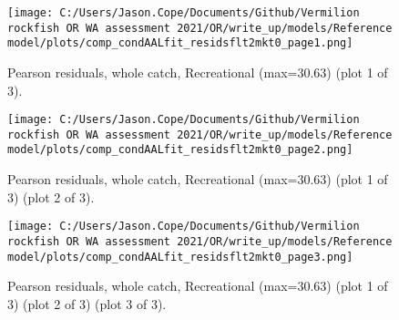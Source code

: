 \documentclass[11pt,
  english,
  a4paper,
]{article}
\begin{document}
\tagmcend\tagstructend


\begin{figure}
\centering
\texttt{[image: C:/Users/Jason.Cope/Documents/Github/Vermilion rockfish OR WA assessment 2021/OR/write\_up/models/Reference model/plots/comp\_condAALfit\_residsflt2mkt0\_page1.png]}
\caption{Pearson residuals, whole catch, Recreational (max=30.63) (plot 1 of 3).\label{fig:comp_condAALfit_residsflt2mkt0_page1}}
\end{figure}

\tagmcend\tagstructend


\begin{figure}
\centering
\texttt{[image: C:/Users/Jason.Cope/Documents/Github/Vermilion rockfish OR WA assessment 2021/OR/write\_up/models/Reference model/plots/comp\_condAALfit\_residsflt2mkt0\_page2.png]}
\caption{Pearson residuals, whole catch, Recreational (max=30.63) (plot 1 of 3) (plot 2 of 3).\label{fig:comp_condAALfit_residsflt2mkt0_page2}}
\end{figure}

\tagmcend\tagstructend


\begin{figure}
\centering
\texttt{[image: C:/Users/Jason.Cope/Documents/Github/Vermilion rockfish OR WA assessment 2021/OR/write\_up/models/Reference model/plots/comp\_condAALfit\_residsflt2mkt0\_page3.png]}
\caption{Pearson residuals, whole catch, Recreational (max=30.63) (plot 1 of 3) (plot 2 of 3) (plot 3 of 3).\label{fig:comp_condAALfit_residsflt2mkt0_page3}}
\end{figure}

\tagmcend\tagstructend
\end{document}
